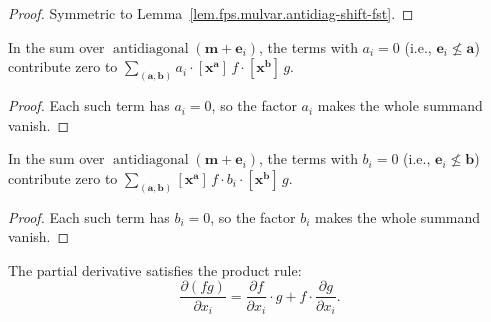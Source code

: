 \begin{proof}
Symmetric to Lemma~\ref{lem.fps.mulvar.antidiag-shift-fst}.
\end{proof}

\begin{lemma}
\label{lem.fps.mulvar.sum-filter-zero-fst}
\leanhelper
\leanok
In the sum over $\operatorname{antidiagonal}(\mathbf{m} + \mathbf{e}_i)$,
the terms with $a_i = 0$ (i.e., $\mathbf{e}_i \not\leq \mathbf{a}$) contribute zero
to $\sum_{(\mathbf{a},\mathbf{b})} a_i \cdot [{\mathbf{x}}^{\mathbf{a}}]\, f \cdot [{\mathbf{x}}^{\mathbf{b}}]\, g$.
\end{lemma}

\begin{proof}
Each such term has $a_i = 0$, so the factor $a_i$ makes the whole
summand vanish.
\end{proof}

\begin{lemma}
\label{lem.fps.mulvar.sum-filter-zero-snd}
\leanhelper
\leanok
In the sum over $\operatorname{antidiagonal}(\mathbf{m} + \mathbf{e}_i)$,
the terms with $b_i = 0$ (i.e., $\mathbf{e}_i \not\leq \mathbf{b}$) contribute zero
to $\sum_{(\mathbf{a},\mathbf{b})} [\mathbf{x}^{\mathbf{a}}]\, f \cdot b_i \cdot [\mathbf{x}^{\mathbf{b}}]\, g$.
\end{lemma}

\begin{proof}
Each such term has $b_i = 0$, so the factor $b_i$ makes the whole
summand vanish.
\end{proof}

\begin{theorem}
\label{thm.fps.mulvar.partialDeriv-mul}
\leanhelper
\leanok
The partial derivative satisfies the product rule:
\[
\frac{\partial (fg)}{\partial x_i}
= \frac{\partial f}{\partial x_i} \cdot g
  + f \cdot \frac{\partial g}{\partial x_i}.
\]
\end{theorem}

